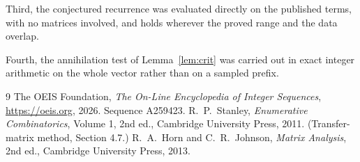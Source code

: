 \documentclass[11pt,a4paper]{article}
\theoremstyle{plain}
\theoremstyle{definition}
\begin{document}
Third, the conjectured recurrence was evaluated directly on the published terms, with no
matrices involved, and holds wherever the proved range and the data overlap.

Fourth, the annihilation test of Lemma~\ref{lem:crit} was carried out in exact integer
arithmetic on the whole vector rather than on a sampled prefix.

\begin{thebibliography}{9}
 The OEIS Foundation, \emph{The On-Line Encyclopedia of Integer
Sequences}, \url{https://oeis.org}, 2026. Sequence A259423.
 R.~P.~Stanley, \emph{Enumerative Combinatorics}, Volume 1, 2nd ed.,
Cambridge University Press, 2011. (Transfer-matrix method, Section 4.7.)
 R.~A.~Horn and C.~R.~Johnson, \emph{Matrix Analysis}, 2nd ed., Cambridge
University Press, 2013.
\end{thebibliography}
\end{document}
